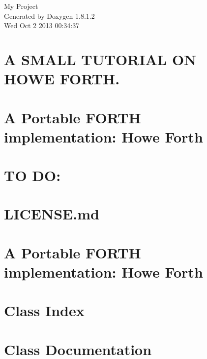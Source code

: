 \documentclass{book}
\begin{document}
\hypersetup{pageanchor=false,citecolor=blue}
\begin{titlepage}
\vspace*{7cm}
\begin{center}
{\Large My Project }\\
\vspace*{1cm}
{\large Generated by Doxygen 1.8.1.2}\\
\vspace*{0.5cm}
{\small Wed Oct 2 2013 00:34:37}\\
\end{center}
\end{titlepage}
\clearemptydoublepage
{}
\tableofcontents
\clearemptydoublepage
{}
\hypersetup{pageanchor=true,citecolor=blue}
\chapter{A S\-M\-A\-L\-L T\-U\-T\-O\-R\-I\-A\-L O\-N H\-O\-W\-E F\-O\-R\-T\-H.}
\label{md_FORTH}
\hypertarget{md_FORTH}{}

\chapter{A Portable F\-O\-R\-T\-H implementation\-: Howe Forth}
\label{md_MANUAL}
\hypertarget{md_MANUAL}{}

\chapter{T\-O D\-O\-:}
\label{md_TODO}
\hypertarget{md_TODO}{}

\chapter{L\-I\-C\-E\-N\-S\-E.\-md}
\label{md_LICENSE}
\hypertarget{md_LICENSE}{}

\chapter{A Portable F\-O\-R\-T\-H implementation\-: Howe Forth}
\label{md_README}
\hypertarget{md_README}{}

\chapter{Class Index}

\chapter{Class Documentation}



\printindex
\end{document}
